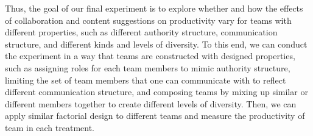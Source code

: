 Thus, the goal of our final experiment is to explore whether and how the effects of collaboration and content suggestions on productivity vary for teams with different properties, such as different authority structure, communication structure, and different kinds and levels of diversity. To this end, we can conduct the experiment in a way that teams are constructed with designed properties, such as assigning roles for each team members to mimic authority structure, limiting the set of team members that one can communicate with to reflect different communication structure, and composing teams by mixing up similar or different members together to create different levels of diversity. Then, we can apply similar factorial design to different teams and measure the productivity of team in each treatment.